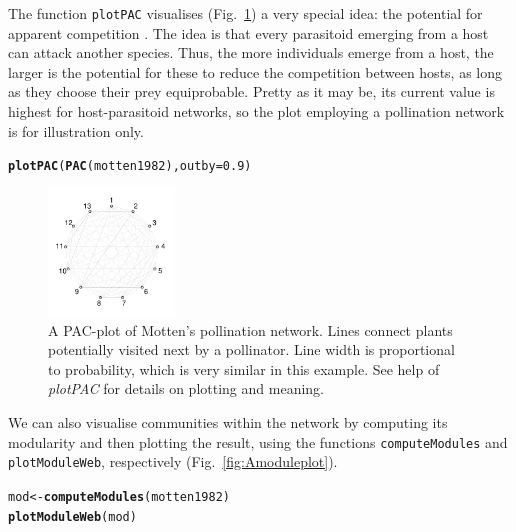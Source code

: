 \documentclass[a4paper, 11pt]{article}\usepackage[]{graphicx}\usepackage[dvipsnames]{xcolor}
\makeatletter
\newcommand{\hlnum}[1]{\textcolor[rgb]{0.686,0.059,0.569}{#1}}%
\newcommand{\hlstd}[1]{\textcolor[rgb]{0.345,0.345,0.345}{#1}}%
\newcommand{\hlkwb}[1]{\textcolor[rgb]{0.69,0.353,0.396}{#1}}%
\newcommand{\hlkwc}[1]{\textcolor[rgb]{0.333,0.667,0.333}{#1}}%
\newcommand{\hlkwd}[1]{\textcolor[rgb]{0.737,0.353,0.396}{\textbf{#1}}}%
\newenvironment{kframe}{%
 \def\at@end@of@kframe{}%
 \ifinner\ifhmode%
  \def\at@end@of@kframe{\end{minipage}}%
  \begin{minipage}{\columnwidth}%
 \fi\fi%
 \def\FrameCommand##1{\hskip\@totalleftmargin \hskip-\fboxsep
 \colorbox{shadecolor}{##1}\hskip-\fboxsep
     \hskip-\linewidth \hskip-\@totalleftmargin \hskip\columnwidth}%
 \MakeFramed {\advance\hsize-\width
   \@totalleftmargin\z@ \linewidth\hsize
   \@setminipage}}%
 {\par\unskip\endMakeFramed%
 \at@end@of@kframe}
\newenvironment{knitrout}{}{} %
\newcommand{\indR}[1]{\texttt{#1}\index{#1@\texttt{#1}}}   %
\makeatother
\begin{document}
The function \indR{plotPAC} visualises  (Fig.~\ref{fig:AplotPAC}) a very special idea: the potential for apparent competition \citep{Morris2005}. The idea is that every parasitoid emerging from a host can attack another species. Thus, the more individuals emerge from a host, the larger is the potential for these to reduce the competition between hosts, as long as they choose their prey equiprobable. Pretty as it may be, its current value is highest for host-parasitoid networks, so the plot employing a pollination network is for illustration only.
\begin{knitrout}
\color{fgcolor}\begin{kframe}
\begin{alltt}
\hlkwd{plotPAC}\hlstd{(}\hlkwd{PAC}\hlstd{(motten1982),} \hlkwc{outby}\hlstd{=}\hlnum{0.9}\hlstd{)}
\end{alltt}
\end{kframe}
\end{knitrout}
%
\begin{figure}
  \centering
	\includegraphics[width=0.3\textwidth]{figures/motten1982_PACplot}
	\caption{A PAC-plot of Motten's \citeyear{Motten1982} pollination network. Lines connect plants potentially visited next by a pollinator. Line width is proportional to probability, which is very similar in this example. See help of \emph{plotPAC} for details on plotting and meaning.}
	\label{fig:AplotPAC}
\end{figure}
%
We can also visualise communities within the network by computing its modularity and then plotting the result, using the functions \texttt{computeModules} and \texttt{plotModuleWeb}, respectively (Fig.~\ref{fig:Amoduleplot}).
\begin{knitrout}
\color{fgcolor}\begin{kframe}
\begin{alltt}
\hlstd{mod} \hlkwb{<-} \hlkwd{computeModules}\hlstd{(motten1982)}
\hlkwd{plotModuleWeb}\hlstd{(mod)}
\end{alltt}
\end{kframe}
\end{knitrout}
\end{document}
